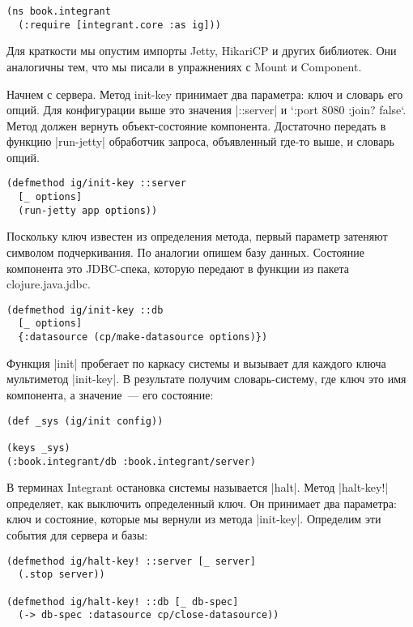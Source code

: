 \begin{verbatim}
(ns book.integrant
  (:require [integrant.core :as ig]))
\end{verbatim}

Для краткости мы опустим импорты Jetty, HikariCP и других библиотек. Они
аналогичны тем, что мы писали в упражнениях с Mount и Component.

Начнем с сервера. Метод init-key принимает два параметра: ключ и словарь его
опций. Для конфигурации выше это значения \spverb|::server| и `{:port 8080 :join?
false}`. Метод должен вернуть объект-состояние компонента. Достаточно передать в
функцию \spverb|run-jetty| обработчик запроса, объявленный где-то выше, и словарь
опций.

\begin{verbatim}
(defmethod ig/init-key ::server
  [_ options]
  (run-jetty app options))
\end{verbatim}

Поскольку ключ известен из определения метода, первый параметр затеняют символом
подчеркивания. По аналогии опишем базу данных. Состояние компонента это
JDBC-спека, которую передают в функции из пакета clojure.java.jdbc.

\begin{verbatim}
(defmethod ig/init-key ::db
  [_ options]
  {:datasource (cp/make-datasource options)})
\end{verbatim}

Функция \spverb|init| пробегает по каркасу системы и вызывает для каждого ключа
мультиметод \spverb|init-key|. В результате получим словарь-систему, где ключ это имя
компонента, а значение~--- его состояние:

\begin{verbatim}
(def _sys (ig/init config))

(keys _sys)
(:book.integrant/db :book.integrant/server)
\end{verbatim}

В терминах Integrant остановка системы называется \spverb|halt|. Метод \spverb|halt-key!|
определяет, как выключить определенный ключ. Он принимает два параметра: ключ и
состояние, которые мы вернули из метода \spverb|init-key|. Определим эти события для
сервера и базы:

\begin{verbatim}
(defmethod ig/halt-key! ::server [_ server]
  (.stop server))

(defmethod ig/halt-key! ::db [_ db-spec]
  (-> db-spec :datasource cp/close-datasource))
\end{verbatim}

